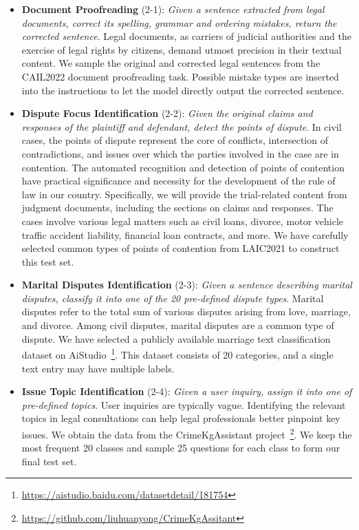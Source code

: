 \begin{itemize}
    \item \textbf{Document Proofreading} (2-1): \emph{Given a sentence extracted from legal documents, correct its spelling, grammar and ordering mistakes, return the corrected sentence}. Legal documents, as carriers of judicial authorities and the exercise of legal rights by citizens, demand utmost precision in their textual content. We sample the original and corrected legal sentences from the CAIL2022 document proofreading task. Possible mistake types are inserted into the instructions to let the model directly output the corrected sentence.
    \item \textbf{Dispute Focus Identification} (2-2): \emph{Given the original claims and responses of the plaintiff and defendant, detect the points of dispute}. In civil cases, the points of dispute represent the core of conflicts, intersection of contradictions, and issues over which the parties involved in the case are in contention. The automated recognition and detection of points of contention have practical significance and necessity for the development of the rule of law in our country. Specifically, we will provide the trial-related content from judgment documents, including the sections on claims and responses. The cases involve various legal matters such as civil loans, divorce, motor vehicle traffic accident liability, financial loan contracts, and more. We have carefully selected common types of points of contention from LAIC2021 to construct this test set.
    \item \textbf{Marital Disputes Identification} (2-3): \emph{Given a sentence describing marital disputes, classify it into one of the 20 pre-defined dispute types}. Marital disputes refer to the total sum of various disputes arising from love, marriage, and divorce. Among civil disputes, marital disputes are a common type of dispute.  We have selected a publicly available marriage text classification dataset on AiStudio~\footnote{\url{https://aistudio.baidu.com/datasetdetail/181754}}. This dataset consists of 20 categories, and a single text entry may have multiple labels.
    \item \textbf{Issue Topic Identification} (2-4): \emph{Given a user inquiry, assign it into one of pre-defined topics}. User inquiries are typically vague. Identifying the relevant topics in legal consultations can help legal professionals better pinpoint key issues. We obtain the data from the CrimeKgAssistant project~\footnote{\url{https://github.com/liuhuanyong/CrimeKgAssitant}}. We keep the most frequent 20 classes and sample 25 questions for each class to form our final test set.

\end{itemize}
